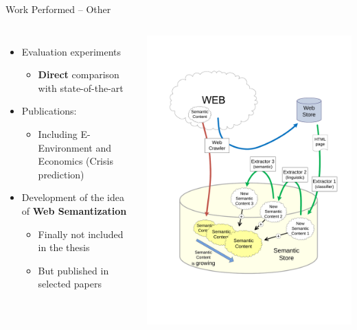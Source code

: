 \documentclass[xcolor=dvipsnames]{beamer}
\begin{document}
\begin{frame}{Work Performed -- Other}
\begin{columns}
\begin{itemize}
	\item Evaluation experiments 	
	\begin{itemize}
		\item \textbf{Direct} comparison with state-of-the-art		
	\end{itemize}
	\item Publications:		
	\begin{itemize}
		\item Including E-Environment and Economics (Crisis prediction)
	\end{itemize}	
	\item Development of the idea of \textbf{Web Semantization}	
	\begin{itemize}
		\item Finally not included in the thesis
		\item But published in selected papers
	\end{itemize}
\end{itemize}
\includegraphics[height=0.5\vsize]{img/growing_semantization}
\end{columns}	
\end{frame}
\end{document}
